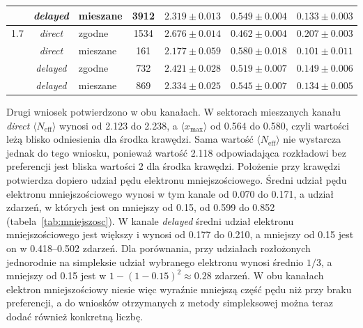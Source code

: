\documentclass[12pt,a4paper]{article}
\newcommand{\Neff}{N_{\mathrm{eff}}}
\newcommand{\xmax}{x_{\max}}
\begin{document}
\begin{table}[htbp]
\begin{tabular}{cclcccc}
          & \emph{delayed} & mieszane & \num{3912} & $\num{2.319}\pm\num{0.013}$ & $\num{0.549}\pm\num{0.004}$ & $\num{0.133}\pm\num{0.003}$ \\
\midrule
\num{1.7} & \emph{direct}  & zgodne   & \num{1534} & $\num{2.676}\pm\num{0.014}$ & $\num{0.462}\pm\num{0.004}$ & $\num{0.207}\pm\num{0.003}$ \\
          & \emph{direct}  & mieszane & \num{161} & $\num{2.177}\pm\num{0.059}$ & $\num{0.580}\pm\num{0.018}$ & $\num{0.101}\pm\num{0.011}$ \\
          & \emph{delayed} & zgodne   & \num{732} & $\num{2.421}\pm\num{0.028}$ & $\num{0.519}\pm\num{0.007}$ & $\num{0.149}\pm\num{0.006}$ \\
          & \emph{delayed} & mieszane & \num{869} & $\num{2.334}\pm\num{0.025}$ & $\num{0.545}\pm\num{0.007}$ & $\num{0.134}\pm\num{0.005}$ \\
\bottomrule
\end{tabular}
\end{table}

Drugi wniosek potwierdzono w obu kanałach. W sektorach mieszanych
kanału \emph{direct} $\langle\Neff\rangle$ wynosi od \num{2.123} do
\num{2.238}, a $\langle\xmax\rangle$ od \num{0.564} do \num{0.580}, czyli
wartości leżą blisko odniesienia dla środka krawędzi. Sama wartość
$\langle\Neff\rangle$ nie wystarcza jednak do tego wniosku, ponieważ
wartość \num{2.118} odpowiadająca rozkładowi bez preferencji jest
bliska wartości \num{2} dla środka krawędzi. Położenie przy krawędzi
potwierdza dopiero udział pędu elektronu mniejszościowego. Średni udział
pędu elektronu mniejszościowego wynosi w tym kanale od \num{0.070} do
\num{0.171}, a udział zdarzeń, w których jest on mniejszy od
\num{0.15}, od \num{0.599} do \num{0.852} (tabela~\ref{tab:mniejszosc}).
W kanale \emph{delayed} średni udział elektronu mniejszościowego jest
większy i wynosi od \num{0.177} do \num{0.210}, a mniejszy od \num{0.15}
jest on w \num{0.418}--\num{0.502} zdarzeń. Dla porównania, przy
udziałach rozłożonych jednorodnie na simpleksie udział wybranego
elektronu wynosi średnio $1/3$, a mniejszy od \num{0.15} jest
w $1-(1-\num{0.15})^2\approx\num{0.28}$ zdarzeń. W obu kanałach
elektron mniejszościowy niesie więc wyraźnie mniejszą część pędu niż
przy braku preferencji, a do wniosków otrzymanych z metody simpleksowej można teraz
dodać również konkretną liczbę.
\end{document}

